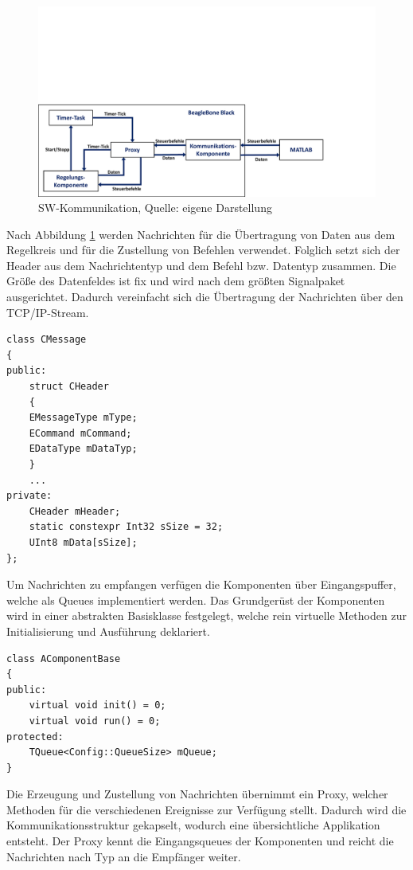 \documentclass{article}
\begin{document}
\begin{figure}[!h]
\centering
\includegraphics[width=0.8\linewidth, trim={0cm 0cm 2.5cm 9.5cm},clip]{img/SW_kommunikation}
\caption{SW-Kommunikation, Quelle: eigene Darstellung}
\label{img_kommunikation_sw}
\end{figure}

Nach Abbildung \ref{img_kommunikation_sw} werden Nachrichten für die Übertragung von Daten aus dem Regelkreis und für die Zustellung von Befehlen verwendet. Folglich setzt sich der Header aus dem Nachrichtentyp und dem Befehl bzw. Datentyp zusammen. Die Größe des Datenfeldes ist fix und wird nach dem größten Signalpaket ausgerichtet. Dadurch vereinfacht sich die Übertragung der Nachrichten über den TCP/IP-Stream.

\begin{lstlisting}
class CMessage
{
public:
	struct CHeader
	{
	EMessageType mType;
	ECommand mCommand;
	EDataType mDataTyp;
	}
	...
private:
	CHeader mHeader;
	static constexpr Int32 sSize = 32;
	UInt8 mData[sSize];
};
\end{lstlisting}

Um Nachrichten zu empfangen verfügen die Komponenten über Eingangspuffer, welche als Queues implementiert werden. Das Grundgerüst der Komponenten wird in einer abstrakten Basisklasse festgelegt, welche rein virtuelle Methoden zur Initialisierung und Ausführung deklariert.

\begin{lstlisting}
class AComponentBase
{
public:
	virtual void init() = 0;
	virtual void run() = 0;
protected:
	TQueue<Config::QueueSize> mQueue;
}
\end{lstlisting}

Die Erzeugung und Zustellung von Nachrichten übernimmt ein Proxy, welcher Methoden für die verschiedenen Ereignisse zur Verfügung stellt. Dadurch wird die Kommunikationsstruktur gekapselt, wodurch eine übersichtliche Applikation entsteht. Der Proxy kennt die Eingangsqueues der Komponenten und reicht die Nachrichten nach Typ an die Empfänger weiter.
\end{document}
